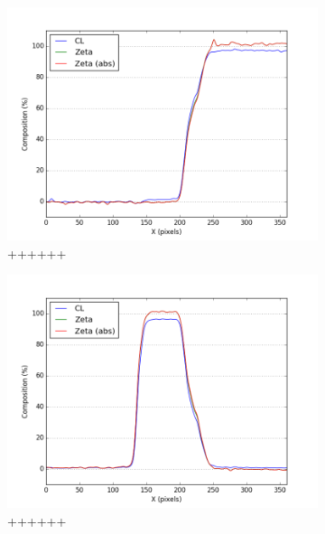 \begin{figure}
\begin{subfigure}{.5\textwidth}
			\includegraphics[width=\linewidth]{fig/q/1_ge2}
			\caption{++++++}
			\label{fig:zeta_area1_ge}
		\end{subfigure}%
		\begin{subfigure}{.5\textwidth}
			\centering
			\includegraphics[width=\linewidth]{fig/q/1_pd2}
			\caption{++++++}
			\label{fig:zeta_area1_pd}
	\end{subfigure}
		\begin{subfigure}{.5\textwidth}
			\centering

\end{subfigure}
\end{figure}
